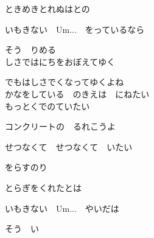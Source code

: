 {ときめきとれぬはとの

いもきない　Um...　をっているなら

そう　りめる
\\

しさではにちをおぼえてゆく

でもはしさでくなってゆくよね
\\

かなをしている　のきえは　にねたい
\\

もっとくでのていたい

コンクリートの　るれこうよ

せつなくて　せつなくて　いたい

をらすのり

とらぎをくれたとは

いもきない　Um...　やいだは

そう　い

}